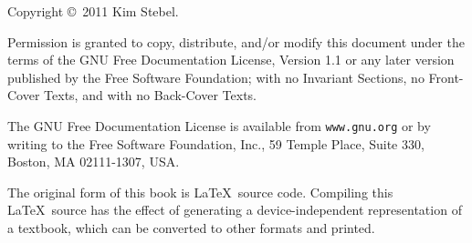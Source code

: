 \documentclass[10pt]{book}
\begin{document}
\begin{latexonly}
\begin{flushright}
\vspace{0.5in}



\vfill

\end{flushright}


\pagebreak
\thispagestyle{empty}

{\small
Copyright \copyright~2011 Kim Stebel.









\vspace{0.2in}


Permission is granted to copy, distribute, and/or modify this document
under the terms of the GNU Free Documentation License, Version 1.1 or
any later version published by the Free Software Foundation; with no
Invariant Sections, no Front-Cover Texts, and with no Back-Cover Texts.

The GNU Free Documentation License is available from {\tt www.gnu.org}
or by writing to the Free Software Foundation, Inc., 59 Temple Place,
Suite 330, Boston, MA 02111-1307, USA.

The original form of this book is \LaTeX\ source code.  Compiling this
\LaTeX\ source has the effect of generating a device-independent
representation of a textbook, which can be converted to other formats
and printed.



\vspace{0.2in}

} %

\end{latexonly}
\end{document}
